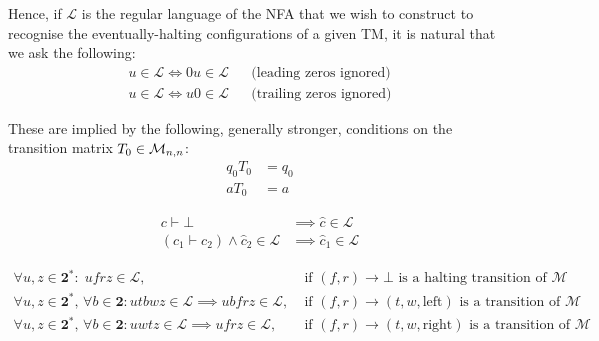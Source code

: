  Hence, if $\mathcal{L}$ is the regular language of the NFA that we wish to construct to recognise the eventually-halting configurations of a given TM, it is natural that we ask the following:
\begin{align*}
  u \in \mathcal{L} \iff 0u \in \mathcal{L} &  & \text{(leading zeros ignored)}
  \\
  u \in \mathcal{L} \iff u0 \in \mathcal{L} &  & \text{(trailing zeros ignored)}
\end{align*}

These are implied by the following, generally stronger, conditions on the transition matrix $T_0 \in \mathcal{M}_{n,n}$:
\begin{align}
  q_0 T_0 & = q_0
  \label{far-cond-leading-0}
  \\
  a T_0   & = a
  \label{far-cond-trailing-0}
\end{align}


\begin{align*}
  c\vdash\bot                                    & \implies \hat{c} \in \mathcal{L}  \\
  (c_1\vdash c_2)\land \hat{c}_2 \in \mathcal{L} & \implies\hat{c}_1 \in \mathcal{L}
\end{align*}

\begin{align*}
  \forall u,z\in\mathbf{2}^*: \; ufrz \in \mathcal{L},\;                                                             & \text{if $(f,r) \to \bot$ is a halting transition of $\mathcal{M}$}
  \\
  \forall u,z\in\mathbf{2}^*,\,\forall b \in \mathbf{2}: utbwz \in \mathcal{L} \implies ubfrz \in \mathcal{L},\;     & \text{if $(f,r) \to (t,w,\text{left})$ is a transition of $\mathcal{M}$}
  \\
  \forall u,z\in\mathbf{2}^*,\,\forall b \in \mathbf{2}: u w t z \in \mathcal{L} \implies u f r z \in \mathcal{L},\; & \text{if $(f,r) \to (t,w,\text{right})$ is a transition of $\mathcal{M}$}
\end{align*}

